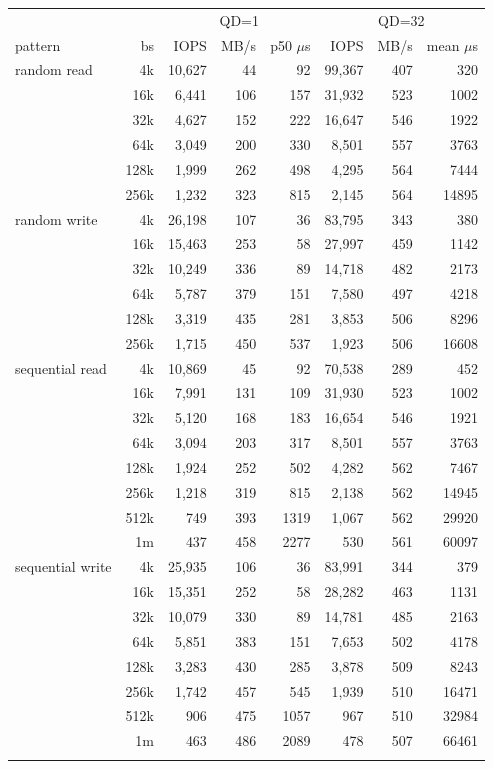 \begin{tabular}{lrrrrrrr}
\toprule
 & & \multicolumn{3}{c}{QD=1} & \multicolumn{3}{c}{QD=32} \\
pattern & bs & IOPS & MB/s & p50 $\mu$s & IOPS & MB/s & mean $\mu$s \\
\midrule
random read & 4k & 10,627 & 44 & 92 & 99,367 & 407 & 320 \\
 & 16k & 6,441 & 106 & 157 & 31,932 & 523 & 1002 \\
 & 32k & 4,627 & 152 & 222 & 16,647 & 546 & 1922 \\
 & 64k & 3,049 & 200 & 330 & 8,501 & 557 & 3763 \\
 & 128k & 1,999 & 262 & 498 & 4,295 & 564 & 7444 \\
 & 256k & 1,232 & 323 & 815 & 2,145 & 564 & 14895 \\
\addlinespace
random write & 4k & 26,198 & 107 & 36 & 83,795 & 343 & 380 \\
 & 16k & 15,463 & 253 & 58 & 27,997 & 459 & 1142 \\
 & 32k & 10,249 & 336 & 89 & 14,718 & 482 & 2173 \\
 & 64k & 5,787 & 379 & 151 & 7,580 & 497 & 4218 \\
 & 128k & 3,319 & 435 & 281 & 3,853 & 506 & 8296 \\
 & 256k & 1,715 & 450 & 537 & 1,923 & 506 & 16608 \\
\addlinespace
sequential read & 4k & 10,869 & 45 & 92 & 70,538 & 289 & 452 \\
 & 16k & 7,991 & 131 & 109 & 31,930 & 523 & 1002 \\
 & 32k & 5,120 & 168 & 183 & 16,654 & 546 & 1921 \\
 & 64k & 3,094 & 203 & 317 & 8,501 & 557 & 3763 \\
 & 128k & 1,924 & 252 & 502 & 4,282 & 562 & 7467 \\
 & 256k & 1,218 & 319 & 815 & 2,138 & 562 & 14945 \\
 & 512k & 749 & 393 & 1319 & 1,067 & 562 & 29920 \\
 & 1m & 437 & 458 & 2277 & 530 & 561 & 60097 \\
\addlinespace
sequential write & 4k & 25,935 & 106 & 36 & 83,991 & 344 & 379 \\
 & 16k & 15,351 & 252 & 58 & 28,282 & 463 & 1131 \\
 & 32k & 10,079 & 330 & 89 & 14,781 & 485 & 2163 \\
 & 64k & 5,851 & 383 & 151 & 7,653 & 502 & 4178 \\
 & 128k & 3,283 & 430 & 285 & 3,878 & 509 & 8243 \\
 & 256k & 1,742 & 457 & 545 & 1,939 & 510 & 16471 \\
 & 512k & 906 & 475 & 1057 & 967 & 510 & 32984 \\
 & 1m & 463 & 486 & 2089 & 478 & 507 & 66461 \\
\addlinespace
\bottomrule
\end{tabular}
